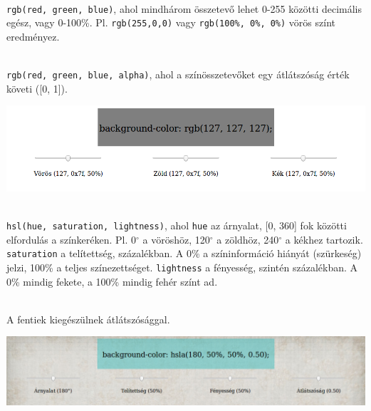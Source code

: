 \begin{frame}
  \begin{description}[m]
    \item[\texttt{rgb()} függvénnyel] \hfill \\ \texttt{rgb(red, 
    green, blue)}, ahol mindhárom összetevő lehet 0-255 közötti 
    decimális egész, vagy 0-100\%. Pl. \texttt{rgb(255,0,0)} vagy 
    \texttt{rgb(100\%, 0\%, 0\%)} vörös színt eredményez.
    \item[\texttt{rgba()} függvénnyel] \hfill \\ \texttt{rgb(red, 
    green, blue, alpha)}, ahol a színösszetevőket egy 
    átlátszóság érték követi ([0, 1]).
  \end{description}
  \vfill
  \begin{center}
    \includegraphics[scale=0.2]{szinek1.png}\\
  \end{center}
\end{frame}

\begin{frame}
  \begin{description}[m]
    \item[\texttt{hsl()} függvénnyel] \hfill \\ \texttt{hsl(hue, 
    saturation, lightness)}, ahol \texttt{hue} az árnyalat, [0, 360] 
    fok közötti elfordulás a színkeréken. Pl. 0$^{\circ}$ a 
    vöröshöz, 120$^{\circ}$ a zöldhöz, 240$^{\circ}$ a kékhez 
    tartozik. \texttt{saturation} a telítettség, százalékban. A 0\% 
    a színinformáció hiányát (szürkeség) jelzi, 100\% a teljes 
    színezettséget. \texttt{lightness} a fényesség, szintén 
    százalékban. A 0\% mindig fekete, a 100\% mindig fehér színt ad.
    \item[\texttt{hsla()} függvénnyel] \hfill \\ A fentiek 
    kiegészülnek átlátszósággal.
  \end{description}
  \vfill
  \begin{center}
    \includegraphics[scale=0.2]{szinek2.png}\\
  \end{center}
\end{frame}

